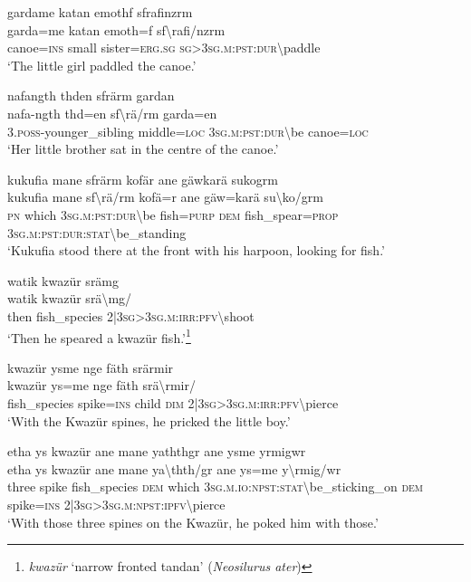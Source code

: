 \ea\label{ex:9:a2275}
gardame katan emothf sfrafinzrm\\
\gll garda=me	katan	emoth=f	sf{\textbackslash}rafi/nzrm\\
     canoe=\textsc{ins}	small	sister=\textsc{erg}.\textsc{sg}	\textsc{sg}>3\textsc{sg}.\textsc{m}:\textsc{pst}:\textsc{dur}{\textbackslash}paddle\\
\glt `The little girl paddled the canoe.'
\z

\ea\label{ex:9:a2276}
nafangth thden sfrärm gardan\\
\gll nafa-ngth	thd=en	sf{\textbackslash}rä/rm	garda=en\\
     3.\textsc{poss}-younger\_sibling	middle=\textsc{loc}	3\textsc{sg}.\textsc{m}:\textsc{pst}:\textsc{dur}{\textbackslash}be	canoe=\textsc{loc}\\
\glt `Her little brother sat in the centre of the canoe.'
\z

\ea\label{ex:9:a2277}
kukufia mane sfrärm kofär ane gäwkarä sukogrm\\
\gll kukufia	mane	sf{\textbackslash}rä/rm	kofä=r	ane	gäw=karä	su{\textbackslash}ko/grm\\
     \textsc{pn}	which	3\textsc{sg}.\textsc{m}:\textsc{pst}:\textsc{dur}{\textbackslash}be	fish=\textsc{purp}	\textsc{dem}	fish\_spear=\textsc{prop}	3\textsc{sg}.\textsc{m}:\textsc{pst}:\textsc{dur}:\textsc{stat}{\textbackslash}be\_standing\\
\glt `Kukufia stood there at the front with his harpoon, looking for fish.'
\z

\ea\label{ex:9:a2279}
watik kwazür srämg\\
\gll watik	kwazür	srä{\textbackslash}mg/\\
     then	fish\_species	2|3\textsc{sg}>3\textsc{sg}.\textsc{m}:\textsc{irr}:\textsc{pfv}{\textbackslash}shoot\\
\glt `Then he speared a kwazür fish.'\footnote{\textit{kwazür} `narrow fronted tandan' (\textit{Neosilurus ater})}
\z

\ea\label{ex:9:a2281}
kwazür ysme nge fäth srärmir\\
\gll kwazür	ys=me	nge	fäth	srä{\textbackslash}rmir/\\
     fish\_species	spike=\textsc{ins}	child	\textsc{dim}	2|3\textsc{sg}>3\textsc{sg}.\textsc{m}:\textsc{irr}:\textsc{pfv}{\textbackslash}pierce\\
\glt `With the Kwazür spines, he pricked the little boy.'
\z

\ea\label{ex:9:a2283}
etha ys kwazür ane mane yaththgr ane ysme yrmigwr\\
\gll etha	ys	kwazür	ane	mane	ya{\textbackslash}thth/gr	ane	ys=me	y{\textbackslash}rmig/wr\\
     three	spike	fish\_species	\textsc{dem}	which	3\textsc{sg}.\textsc{m}.\textsc{io}:\textsc{npst}:\textsc{stat}{\textbackslash}be\_sticking\_on	\textsc{dem}	spike=\textsc{ins}	2|3\textsc{sg}>3\textsc{sg}.\textsc{m}:\textsc{npst}:\textsc{ipfv}{\textbackslash}pierce\\
\glt `With those three spines on the Kwazür, he poked him with those.'
\z

